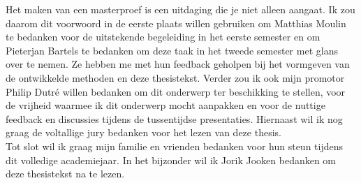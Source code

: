 \documentclass[master=cws,masteroption=mmc]{kulemt}
\begin{document}
\begin{preface}
  Het maken van een masterproef is een uitdaging die je niet alleen aangaat. Ik zou daarom dit voorwoord in de eerste plaats willen gebruiken om Matthias Moulin te bedanken voor de uitstekende begeleiding in het eerste semester en om Pieterjan Bartels te bedanken om deze taak in het tweede semester met glans over te nemen. Ze hebben me met hun feedback geholpen bij het vormgeven van de ontwikkelde methoden en deze thesistekst. Verder zou ik ook mijn promotor Philip Dutré willen bedanken om dit onderwerp ter beschikking te stellen, voor de vrijheid waarmee ik dit onderwerp mocht aanpakken en voor de nuttige feedback en discussies tijdens de tussentijdse presentaties. Hiernaast wil ik nog graag de voltallige jury bedanken voor het lezen van deze thesis.\\

  Tot slot wil ik graag mijn familie en vrienden bedanken voor hun steun tijdens dit volledige academiejaar. In het bijzonder wil ik Jorik Jooken bedanken om deze thesistekst na te lezen.
\end{preface}

\tableofcontents*
\end{document}
